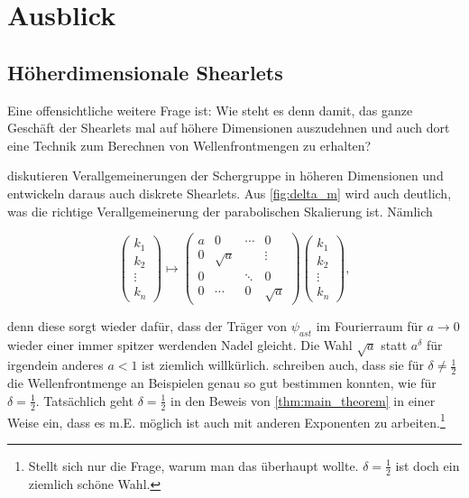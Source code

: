 
\section{Ausblick} %
\label{sec:ausblick}

\subsection{Höherdimensionale Shearlets}
Eine offensichtliche weitere Frage ist: Wie steht es denn damit, das ganze Geschäft der Shearlets mal auf höhere Dimensionen auszudehnen und auch dort eine Technik zum Berechnen von Wellenfrontmengen zu erhalten?

\textcite{Guo2006} diskutieren Verallgemeinerungen der Schergruppe in höheren Dimensionen und entwickeln daraus auch diskrete Shearlets. Aus \cref{fig:delta_m} wird auch deutlich, was die richtige Verallgemeinerung der parabolischen Skalierung ist. Nämlich

\begin{equation*}
\begin{pmatrix}
k_1 \\ k_2 \\ \vdots \\ k_n
\end{pmatrix}
\mapsto
\begin{pmatrix}
	a & 0 		& \cdots & 0\\
	0 & \sqrt a & 		 & 	\vdots\\
	0 & 			& \ddots & 0 \\
	0 & \cdots  & 	0    & \sqrt{a}
\end{pmatrix}
\begin{pmatrix}
k_1 \\ k_2 \\ \vdots \\ k_n
\end{pmatrix},
\end{equation*}

denn diese sorgt wieder dafür, dass der Träger von $\psi_{ast}$ im Fourierraum für $a \to 0$ wieder einer immer spitzer werdenden Nadel gleicht. Die Wahl $\sqrt{a}$ statt $a^\delta$ für irgendein anderes $a<1$ ist ziemlich willkürlich. \textcite{Kutyniok2008} schreiben auch, dass sie für $\delta \neq \frac{1}{2}$ die Wellenfrontmenge an Beispielen genau so gut bestimmen konnten, wie für $\delta = \frac{1}{2}$. Tatsächlich geht $\delta = \frac{1}{2}$ in den Beweis von \cref{thm:main_theorem} in einer Weise ein, dass es m.E. möglich ist auch mit anderen Exponenten zu arbeiten.\footnote{Stellt sich nur die Frage, warum man das überhaupt wollte. $\delta = \frac{1}{2}$ ist doch ein ziemlich schöne Wahl.}

